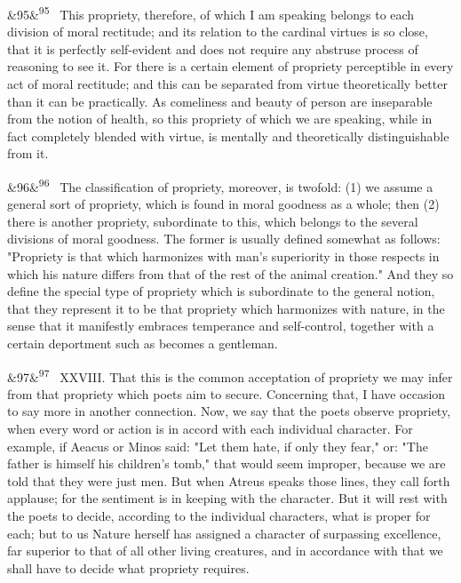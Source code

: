 \documentclass[12pt]{article}
\newcommand{\para}[1][]{\par\noindent\ifx&#1&\else\textsuperscript{\footnotesize #1}~\fi}
\begin{document}
\para[95] This propriety, therefore, of which I am speaking belongs to each division of moral rectitude; and its relation to the cardinal virtues is so close, that it is perfectly self-evident and does not require any abstruse process of reasoning to see it. For there is a certain element of propriety perceptible in every act of moral rectitude; and this can be separated from virtue theoretically better than it can be practically. As comeliness and beauty of person are inseparable from the notion of health, so this propriety of which we are speaking, while in fact completely blended with virtue, is mentally and theoretically distinguishable from it.

\para[96] The classification of propriety, moreover, is twofold: (1) we assume a general sort of propriety, which is found in moral goodness as a whole; then (2) there is another propriety, subordinate to this, which belongs to the several divisions of moral goodness. The former is usually defined somewhat as follows: "Propriety is that which harmonizes with man's superiority in those respects in which his nature differs from that of the rest of the animal creation." And they so define the special type of propriety which is subordinate to the general notion, that they represent it to be that propriety which harmonizes with nature, in the sense that it manifestly embraces temperance and self-control, together with a certain deportment such as becomes a gentleman.

\para[97] XXVIII. That this is the common acceptation of propriety we may infer from that propriety which poets aim to secure. Concerning that, I have occasion to say more in another connection. Now, we say that the poets observe propriety, when every word or action is in accord with each individual character. For example, if Aeacus or Minos said: "Let them hate, if only they fear," or: "The father is himself his children's tomb," that would seem improper, because we are told that they were just men. But when Atreus speaks those lines, they call forth applause; for the sentiment is in keeping with the character. But it will rest with the poets to decide, according to the individual characters, what is proper for each; but to us Nature herself has assigned a character of surpassing excellence, far superior to that of all other living creatures, and in accordance with that we shall have to decide what propriety requires.
\end{document}
